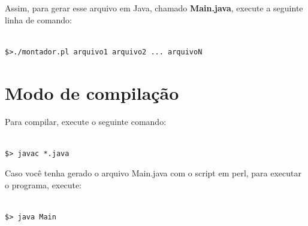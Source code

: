 \documentclass[11pt]{article}
\begin{document}
Assim, para gerar esse arquivo em Java, chamado \textbf{\color{red}Main.java}, execute a seguinte linha de comando:
\begin{verbatim}

$>./montador.pl arquivo1 arquivo2 ... arquivoN

\end{verbatim}

\section{Modo de compilação}

Para compilar, execute o seguinte comando:

\begin{verbatim}

$> javac *.java

\end{verbatim}

Caso você tenha gerado o arquivo Main.java com o script em perl, para executar o programa, execute:

\begin{verbatim}

$> java Main

\end{verbatim}
\end{document}
